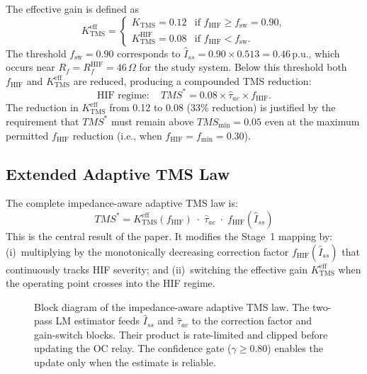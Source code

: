 \documentclass[10pt,journal,twoside]{IEEEtran}
\newcommand{\pu}{\,\text{p.u.}}
\newcommand{\Rf}{R_{\!f}}
\newcommand{\tms}{TMS}
\newcommand{\tmss}{TMS^*}
\newcommand{\Iss}{\hat{I}_{ss}}
\newcommand{\tauac}{\hat{\tau}_{ac}}
\newcommand{\fhif}{f_{\mathrm{HIF}}}
\newcommand{\Keff}{K_{\mathrm{TMS}}^{\mathrm{eff}}}
\begin{document}
The effective gain is defined as
\begin{equation}
\Keff =
\begin{cases}
  K_{\mathrm{TMS}} = 0.12 & \text{if } \fhif \geq f_{\mathrm{sw}} = 0.90,\\[2pt]
  K_{\mathrm{TMS}}^{\mathrm{HIF}} = 0.08 & \text{if } \fhif < f_{\mathrm{sw}}.
\end{cases}
\label{eq:Keff}
\end{equation}
The threshold $f_{\mathrm{sw}} = 0.90$ corresponds to
$\Iss = 0.90 \times 0.513 = 0.46\pu$,
which occurs near $\Rf = R_f^{\mathrm{HIF}} = 46\,\Omega$ for the study system.
Below this threshold both $\fhif$ and $\Keff$ are reduced, producing a
compounded TMS reduction:
\begin{equation}
\text{HIF regime}: \quad
\tmss = 0.08 \times \tauac \times \fhif.
\label{eq:tms_hif}
\end{equation}
The reduction in $\Keff$ from 0.12 to 0.08 (33\% reduction) is justified
by the requirement that $\tmss$ must remain above $\tms_{\min} = 0.05$ even
at the maximum permitted $\fhif$ reduction (i.e., when $\fhif = f_{\min} = 0.30$).

\subsection{Extended Adaptive TMS Law}
\label{sec:tmslaw:law}

The complete impedance-aware adaptive TMS law is:
\begin{equation}
\boxed{\tmss = \Keff(\fhif)\;\cdot\;\tauac\;\cdot\;\fhif(\Iss)}
\label{eq:tms_ext}
\end{equation}
This is the central result of the paper.  It modifies the Stage~1 mapping
by:
(i)~multiplying by the monotonically decreasing correction factor
$\fhif(\Iss)$ that continuously tracks HIF severity; and
(ii)~switching the effective gain $\Keff$ when the operating point crosses
into the HIF regime.

\begin{figure}[!t]
\centering
\scalebox{0.82}{%
%
}
\caption{Block diagram of the impedance-aware adaptive TMS law.  The two-pass
  LM estimator feeds $\Iss$ and $\tauac$ to the correction factor and
  gain-switch blocks.  Their product is rate-limited and clipped before
  updating the OC relay.  The confidence gate ($\gamma \geq 0.80$) enables
  the update only when the estimate is reliable.}
\label{fig:tms_blockdiagram}
\end{figure}
\end{document}
